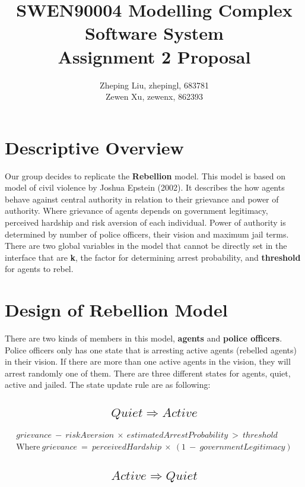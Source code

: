 \documentclass[UTF8,11pt]{article}
\title{SWEN90004 Modelling Complex Software System\\
      \textbf{Assignment 2 Proposal}}
\author{Zheping Liu, zhepingl, 683781\\
        Zewen Xu, zewenx, 862393}
\date{}
\begin{document}
    \maketitle
    \section{Descriptive Overview}
        Our group decides to replicate the \textbf{Rebellion} model.
        This model is based on model of civil violence by Joshua Epstein (2002).
        It describes the how agents behave against central authority in relation
        to their grievance and power of authority. Where grievance of agents
        depends on government legitimacy, perceived hardship and risk aversion 
        of each individual. Power of authority is determined by number of police
        officers, their vision and maximum jail terms. There are two global 
        variables in the model that cannot be directly set in the interface that 
        are \textbf{k}, the factor for determining arrest probability, and 
        \textbf{threshold} for agents to rebel.

    \section{Design of Rebellion Model}
        There are two kinds of members in this model, \textbf{agents} and 
        \textbf{police officers}. Police officers only has one state that is
        arresting active agents (rebelled agents) in their vision. If there are
        more than one active agents in the vision, they will arrest randomly one
        of them. There are three different states for agents, quiet, active and
        jailed. The state update rule are as following:
        \subsection{\[Quiet \Rightarrow Active\]}
        \begin{equation}
            \begin{split}
                grievance\:-\:riskAversion\:\times\:estimatedArrestProbability\:>\:threshold \\
                \text{Where}\ grievance\:=\:perceivedHardship\:\times\:(1\:-\:governmentLegitimacy)
            \end{split}
        \end{equation}
        \subsection{\[Active \Rightarrow Quiet\]}
\end{document}
